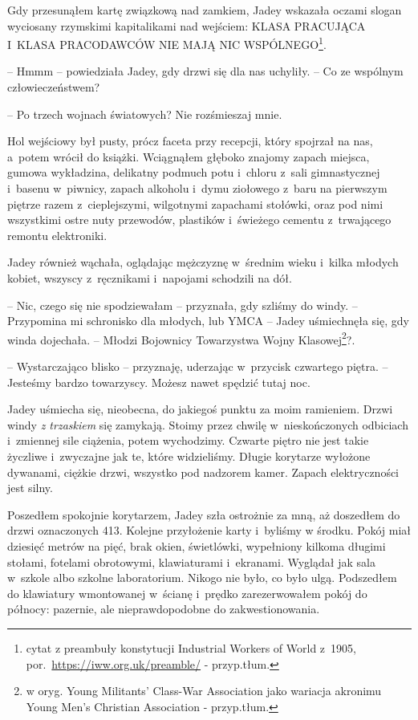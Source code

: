 \documentclass[oneside,polish,12pt,sfheadings]{mwbk}
\begin{document}
Gdy przesunąłem kartę związkową nad zamkiem, Jadey wskazała oczami
slogan wyciosany rzymskimi kapitalikami nad wejściem: KLASA PRACUJĄCA I~KLASA PRACODAWCÓW NIE MAJĄ NIC WSPÓLNEGO\footnote{cytat
z preambuły konstytucji Industrial Workers of World z~1905, por.~\url{https://iww.org.uk/preamble/} - przyp.tłum.}.

-- Hmmm -- powiedziała Jadey, gdy drzwi się dla nas uchyliły. -- Co ze
wspólnym człowieczeństwem?

-- Po trzech wojnach światowych? Nie rozśmieszaj mnie.

Hol wejściowy był pusty, prócz faceta przy recepcji, który spojrzał na
nas, a~potem wrócił do książki. Wciągnąłem głęboko znajomy zapach
miejsca, gumowa wykładzina, delikatny podmuch potu i~chloru z~sali
gimnastycznej i~basenu w~piwnicy, zapach alkoholu i~dymu ziołowego z~baru na pierwszym piętrze razem z~cieplejszymi, wilgotnymi zapachami
stołówki, oraz pod nimi wszystkimi ostre nuty przewodów, plastików i~świeżego cementu z~trwającego remontu elektroniki.

Jadey również wąchała, oglądając mężczyznę w~średnim wieku i~kilka
młodych kobiet, wszyscy z~ręcznikami i~napojami schodzili na dół.

-- Nic, czego się nie spodziewałam -- przyznała, gdy szliśmy do windy. --
Przypomina mi schronisko dla młodych, lub YMCA -- Jadey uśmiechnęła się,
gdy winda dojechała. -- Młodzi Bojownicy Towarzystwa Wojny
Klasowej\footnote{w oryg. Young Militants' Class-War
Association jako wariacja akronimu Young Men's Christian Association -
przyp.tłum.}?.

-- Wystarczająco blisko -- przyznaję, uderzając w~przycisk czwartego
piętra. -- Jesteśmy bardzo towarzyscy. Możesz nawet spędzić tutaj noc.

Jadey uśmiecha się, nieobecna, do jakiegoś punktu za moim ramieniem.
Drzwi windy \emph{z trzaskiem }się zamykają. Stoimy przez chwilę w~nieskończonych odbiciach i~zmiennej sile ciążenia, potem wychodzimy.
Czwarte piętro nie jest takie życzliwe i~zwyczajne jak te, które
widzieliśmy. Długie korytarze wyłożone dywanami, ciężkie drzwi, wszystko
pod nadzorem kamer. Zapach elektryczności jest silny.

Poszedłem spokojnie korytarzem, Jadey szła ostrożnie za mną, aż
doszedłem do drzwi oznaczonych 413. Kolejne przyłożenie karty i~byliśmy
w środku. Pokój miał dziesięć metrów na pięć, brak okien, świetlówki,
wypełniony kilkoma długimi stołami, fotelami obrotowymi, klawiaturami i~ekranami. Wyglądał jak sala w~szkole albo szkolne laboratorium. Nikogo
nie było, co było ulgą. Podszedłem do klawiatury wmontowanej w~ścianę i~prędko zarezerwowałem pokój do północy: pazernie, ale nieprawdopodobne
do zakwestionowania.
\end{document}
